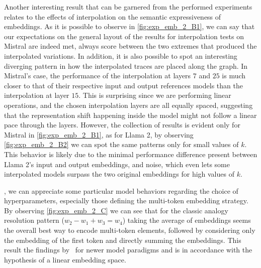 Another interesting result that can be garnered from the performed experiments relates to the effects of interpolation on the semantic expressiveness of embeddings.
As it is possible to observe in \cref{fig:exp_emb_2_B1}, we can say that our expectations on the general layout of the results for interpolation tests on Mistral are indeed met,  always score between the two extremes that produced the interpolated variations.
In addition, it is also possible to spot an interesting diverging pattern in how the interpolated traces are placed along the graph.
In Mistral's case, the performance of the interpolation at layers $7$ and $25$ is much closer to that of their respective input and output references models than the interpolation at layer $15$.
This is surprising since we are performing linear operations, and the chosen interpolation layers are all equally spaced, suggesting that the representation shift happening inside the model might not follow a linear pace through the layers.
However, the  collection of results is evident only for Mistral in \cref{fig:exp_emb_2_B1}, as for Llama 2, by observing \cref{fig:exp_emb_2_B2} we can spot the same patterns only for small values of $k$.
This behavior is likely due to the minimal performance difference present between Llama 2's input and output embeddings, and noise, which even lets some interpolated models surpass the two original embeddings for high values of $k$.

\begin{figure}[t!]
    \centering
    \caption{}
    \label{fig:exp_emb_2_B}
\end{figure}

, we can appreciate some particular model behaviors regarding the choice of hyperparameters, especially those defining the multi-token embedding strategy.
By observing \cref{fig:exp_emb_2_C} we can see that for the classic analogy resolution pattern ($w_2 - w_1 + w_3 = w_4$) taking the average of embeddings seems the overall best way to encode multi-token elements, followed by considering only the embedding of the first token and directly summing the embeddings.
This result  the findings  by~\citet{drozd2016} for newer model paradigms and is in accordance with the hypothesis of a linear embedding space.

